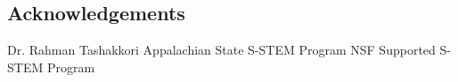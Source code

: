 \documentclass[a0,portrait]{a0poster}
\begin{document}
\begin{multicols}{2}

\nocite{*} %


\section*{Acknowledgements}

Dr. Rahman Tashakkori
Appalachian State S-STEM Program\newline
NSF Supported S-STEM Program


\end{multicols}
\end{document}
